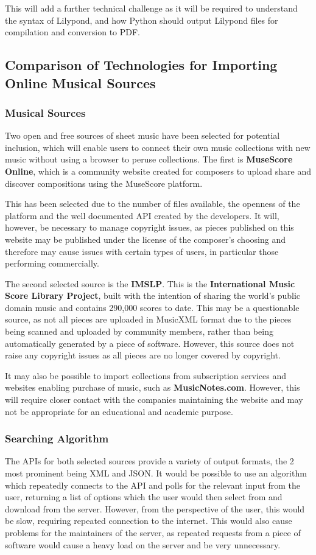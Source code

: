 This will add a further technical challenge as it will be required to understand the syntax of Lilypond, and how Python should output Lilypond files for compilation and conversion to PDF.

\subsection{Comparison of Technologies for Importing Online Musical Sources}
\subsubsection{Musical Sources}
Two open and free sources of sheet music have been selected for potential inclusion, which will enable users to connect their own music collections with new music without using a browser to peruse collections. The first is \textbf{MuseScore Online}, which is a community website created for composers to upload share and discover compositions using the MuseScore platform. \parencite{MuseShare}

This has been selected due to the number of files available, the openness of the platform and the well documented API created by the developers. It will, however, be necessary to manage copyright issues, as pieces published on this website may be published under the license of the composer's choosing and therefore may cause issues with certain types of users, in particular those performing commercially.

The second selected source is the \textbf{IMSLP}. This is the \textbf{International Music Score Library Project}, built with the intention of sharing the world’s public domain music and contains 290,000 scores to date.\parencite{imslp} This may be a questionable source, as not all pieces are uploaded in MusicXML format due to the pieces being scanned and uploaded by community members, rather than being automatically generated by a piece of software. However, this source does not raise any copyright issues as all pieces are no longer covered by copyright.

It may also be possible to import collections from subscription services and websites enabling purchase of music, such as \textbf{MusicNotes.com}. However, this will require closer contact with the companies maintaining the website and may not be appropriate for an educational and academic purpose.

\subsubsection{Searching Algorithm}
The APIs for both selected sources provide a variety of output formats, the 2 most prominent being XML and JSON. 
It would be possible to use an algorithm which repeatedly connects to the API and polls for the relevant input from the user, returning a list of options which the user would then select from and download from the server. However, from the perspective of the user, this would be slow, requiring repeated connection to the internet. This would also cause problems for the maintainers of the server, as repeated requests from a piece of software would cause a heavy load on the server and be very unnecessary.

